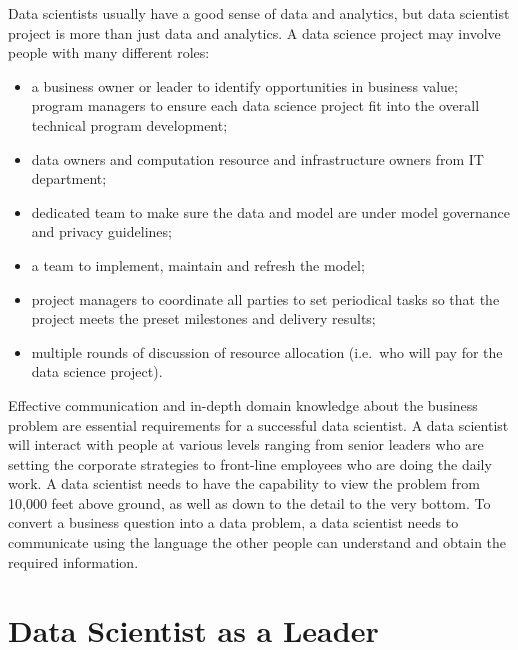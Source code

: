 \documentclass[12pt,]{krantz}
\providecommand{\tightlist}{%
  \setlength{\itemsep}{0pt}\setlength{\parskip}{0pt}}
\theoremstyle{definition}
\theoremstyle{definition}
\theoremstyle{remark}
\begin{document}
Data scientists usually have a good sense of data and analytics, but
data scientist project is more than just data and analytics. A data
science project may involve people with many different roles:

\begin{itemize}
\tightlist
\item
  a business owner or leader to identify opportunities in business
  value; program managers to ensure each data science project fit into
  the overall technical program development;
\item
  data owners and computation resource and infrastructure owners from IT
  department;
\item
  dedicated team to make sure the data and model are under model
  governance and privacy guidelines;
\item
  a team to implement, maintain and refresh the model;
\item
  project managers to coordinate all parties to set periodical tasks so
  that the project meets the preset milestones and delivery results;
\item
  multiple rounds of discussion of resource allocation (i.e.~who will
  pay for the data science project).
\end{itemize}

Effective communication and in-depth domain knowledge about the business
problem are essential requirements for a successful data scientist. A
data scientist will interact with people at various levels ranging from
senior leaders who are setting the corporate strategies to front-line
employees who are doing the daily work. A data scientist needs to have
the capability to view the problem from 10,000 feet above ground, as
well as down to the detail to the very bottom. To convert a business
question into a data problem, a data scientist needs to communicate
using the language the other people can understand and obtain the
required information.

\section{Data Scientist as a Leader}\label{data-scientist-as-a-leader}
\end{document}
